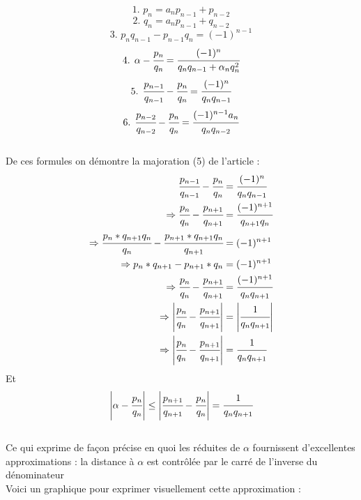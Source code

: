 \documentclass[moyen]{classeUPD}
\begin{document}
$$\text{1. }p_{n}=a_{n}p_{n-1}+p_{n-2}$$
$$\text{2. }q_{n}=a_{n}p_{n-1}+q_{n-2}$$
$$\text{3. } p_{n}q_{n-1}-p_{n-1}q_{n}=(-1)^{n-1}$$
$$\text{4. }\alpha - \cfrac{p_{n}}{q_{n}} = \cfrac{(-1)^{n}}{q_{n}q_{n-1}+\alpha_{n}q_{n}^{2}}$$
$$\text{5. }\cfrac{p_{n-1}}{q_{n-1}}-\cfrac{p_{n}}{q_{n}}= \cfrac{(-1)^{n}}{q_{n}q_{n-1}}$$
$$\text{6. }\cfrac{p_{n-2}}{q_{n-2}}-\cfrac{p_{n}}{q_{n}}= \cfrac{(-1)^{n-1}a_{n}}{q_{n}q_{n-2}}$$\\

De ces formules on démontre la majoration (5) de l’article \cite{caruso_application_nodate} :\\

\begin{align*}
	\cfrac{p_{n-1}}{q_{n-1}}-\cfrac{p_{n}}{q_{n}}&= \cfrac{(-1)^{n}}{q_{n}q_{n-1}}\\
	\Rightarrow\cfrac{p_{n}}{q_{n}}-\cfrac{p_{n+1}}{q_{n+1}}&= \cfrac{(-1)^{n+1}}{q_{n+1}q_{n}}\\
	\Rightarrow\cfrac{p_{n}*q_{n+1}q_{n}}{q_{n}}-\cfrac{p_{n+1}*q_{n+1}q_{n}}{q_{n+1}}&= (-1)^{n+1}\\
	\Rightarrow p_{n}*q_{n+1}-p_{n+1}*q_{n}&= (-1)^{n+1}\\
	\Rightarrow\cfrac{p_{n}}{q_{n}}-\cfrac{p_{n+1}}{q_{n+1}}&=\cfrac{(-1)^{n+1}}{q_{n}q_{n+1}}\\
	\Rightarrow\left|\cfrac{p_{n}}{q_{n}}-\cfrac{p_{n+1}}{q_{n+1}}\right|&=\left|\cfrac{1}{q_{n}q_{n+1}}\right|\\
	\Rightarrow\left|\cfrac{p_{n}}{q_{n}}-\cfrac{p_{n+1}}{q_{n+1}}\right|&=\cfrac{1}{q_{n}q_{n+1}}
\end{align*}
Et
$$\left|\alpha-\cfrac{p_{n}}{q_{n}}\right| \le \left|\cfrac{p_{n+1}}{q_{n+1}}-\cfrac{p_{n}}{q_{n}}\right|=\cfrac{1}{q_{n}q_{n+1}}$$\\

Ce qui exprime de façon précise en quoi les réduites de $\alpha$ fournissent d'excellentes approximations : la distance à $\alpha$ est contrôlée par le carré de l'inverse du dénominateur\\

Voici un graphique pour exprimer visuellement cette approximation :\\
\end{document}
